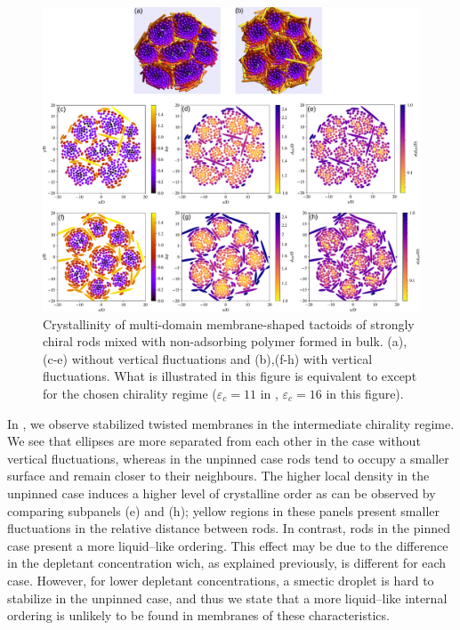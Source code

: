 \begin{figure}
\begin{center}
\includegraphics[width= \columnwidth]{figures/chapter-5/crystallinity_16}
	\caption[Crystallinity of membrane-shaped tactoids of chiral rods mixed with non-adsorbing polymer formed in bulk $\varepsilon_c=16$.]{ \label{crystal16} Crystallinity of multi-domain membrane-shaped tactoids of strongly chiral rods mixed with non-adsorbing polymer formed in bulk. (a),(c-e) without vertical fluctuations and (b),(f-h) with vertical fluctuations. What is illustrated in this figure is equivalent to  except for the chosen chirality regime ($\varepsilon_c=11$ in , $\varepsilon_c=16$ in this figure).}
\end{center}
\end{figure}

In , we observe stabilized twisted membranes in the intermediate chirality regime. We see that ellipses are more separated from each other in the case without vertical fluctuations, whereas in the unpinned case rods tend to occupy a smaller surface and remain closer to their neighbours. The higher local density in the unpinned case induces a higher level of crystalline order as can be observed by comparing subpanels (e) and (h); yellow regions in these panels present smaller fluctuations in the relative distance between rods. In contrast, rods in the pinned case present a more liquid--like ordering. This effect may be due to the difference in the depletant concentration wich, as explained previously, is different for each case. However, for lower depletant concentrations, a smectic droplet is hard to stabilize in the unpinned case, and thus we state that a more liquid--like internal ordering is unlikely to be found in membranes of these characteristics.



